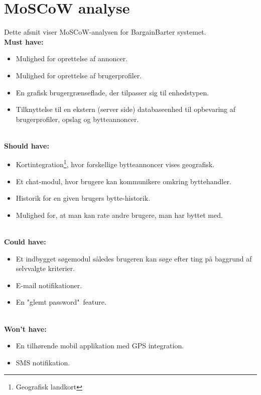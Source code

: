 \chapter{MoSCoW analyse}
Dette afsnit viser MoSCoW-analysen for BargainBarter systemet. \\
\textbf{Must have:}
\begin{itemize}[noitemsep]
	\item Mulighed for oprettelse af annoncer.
	\item Mulighed for oprettelse af brugerprofiler.
	\item En grafisk brugergrænseflade, der tilpasser sig til enhedstypen.
	\item Tilknyttelse til en ekstern (server side) databaseenhed til opbevaring af brugerprofiler, opslag og bytteannoncer.
	
\end{itemize}

\textbf{\\Should have:}
\begin{itemize}[noitemsep]
	\item Kortintegration\footnote{Geografisk landkort}, hvor forskellige bytteannoncer vises geografisk.
	\item Et chat-modul, hvor brugere kan kommunikere omkring byttehandler.
	\item Historik for en given brugers bytte-historik.
	\item Mulighed for, at man kan rate andre brugere, man har byttet med.
\end{itemize}

\textbf{\\Could have:}
\begin{itemize}[noitemsep]
	\item Et indbygget søgemodul således brugeren kan søge efter ting på baggrund af selvvalgte kriterier.
	\item E-mail notifikationer.
	\item En "glemt password"\ feature.
\end{itemize}

\textbf{\\Won't have:}
\begin{itemize}[noitemsep]
	\item En tilhørende mobil applikation med GPS integration.
	\item SMS notifikation.
\end{itemize}


